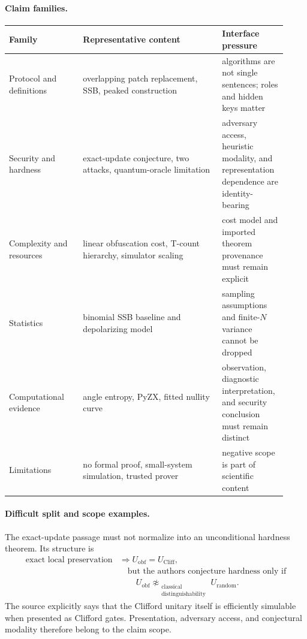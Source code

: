 \paragraph{Claim families.}
\begin{center}
\begin{tabular}{p{0.25\linewidth}p{0.47\linewidth}p{0.20\linewidth}}
\toprule
Family & Representative content & Interface pressure\\
\midrule
Protocol and definitions & overlapping patch replacement, SSB, peaked construction & algorithms are not single sentences; roles and hidden keys matter\\
Security and hardness & exact-update conjecture, two attacks, quantum-oracle limitation & adversary access, heuristic modality, and representation dependence are identity-bearing\\
Complexity and resources & linear obfuscation cost, T-count hierarchy, simulator scaling & cost model and imported theorem provenance must remain explicit\\
Statistics & binomial SSB baseline and depolarizing model & sampling assumptions and finite-$N$ variance cannot be dropped\\
Computational evidence & angle entropy, PyZX, fitted nullity curve & observation, diagnostic interpretation, and security conclusion must remain distinct\\
Limitations & no formal proof, small-system simulation, trusted prover & negative scope is part of scientific content\\
\bottomrule
\end{tabular}
\end{center}

\paragraph{Difficult split and scope examples.}
The exact-update passage must not normalize into an unconditional hardness theorem. Its structure is
\[
\begin{aligned}
\text{exact local preservation}
&\Longrightarrow U_{\mathrm{obf}}=U_{\mathrm{Cliff}},\\
&\quad\text{but the authors conjecture hardness only if}\\
&\qquad U_{\mathrm{obf}}\not\approx_{\substack{\text{classical}\\\text{distinguishability}}}U_{\mathrm{random}}.
\end{aligned}
\]
The source explicitly says that the Clifford unitary itself is efficiently simulable when presented as Clifford gates. Presentation, adversary access, and conjectural modality therefore belong to the claim scope.

